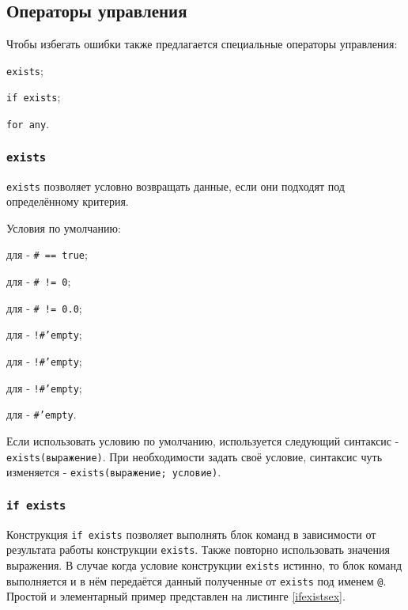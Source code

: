 \subsection{Операторы управления}

Чтобы избегать ошибки также предлагается специальные операторы управления:
\begin{icItems}
	\item \texttt{exists};
	\item \texttt{if exists};
	\item \texttt{for any}.
\end{icItems}

\subsubsection{\texttt{exists}}

\texttt{exists} позволяет условно возвращать данные, если они подходят под определённому критерия.

Условия по умолчанию:
\begin{icItems}
	\item
	для \bool{} - \texttt{# == true};
	\item
	для \integer{} - \texttt{# != 0};
	\item
	для \double{} - \texttt{# != 0.0};
	\item
	для \str{} - \texttt{!#'empty};
	\item
	для \listtype{} - \texttt{!#'empty};
	\item
	для \set{} - \texttt{!#'empty};
	\item
	для \element{} - \texttt{#'empty}.
\end{icItems}

Если использовать условию по умолчанию, используется следующий синтаксис - \texttt{exists(выражение)}.
При необходимости задать своё условие, синтаксис чуть изменяется - \texttt{exists(выражение; условие)}.

\subsubsection{\texttt{if exists}}

Конструкция \texttt{if exists} позволяет выполнять блок команд в зависимости от результата работы конструкции \texttt{exists}. Также повторно использовать значения выражения. В случае когда условие конструкции \texttt{exists} истинно, то блок команд выполняется и в нём передаётся данный полученные от \texttt{exists} под именем \texttt{@}.
Простой и элементарный пример представлен на листинге \ref{ifexistsex}.

